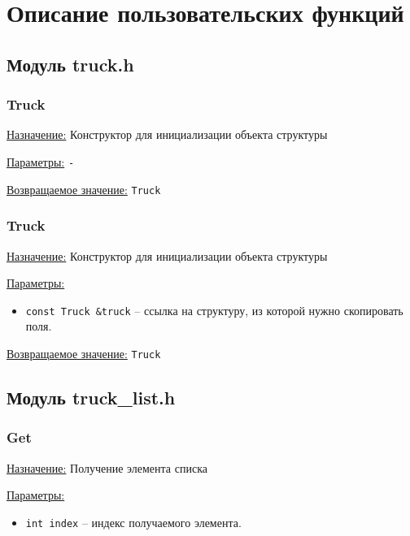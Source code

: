 \section*{Описание пользовательских функций}

\subsection*{Модуль truck.h}

\subsubsection*{Truck}

\underline{Назначение:} Конструктор для инициализации объекта структуры

\underline{Параметры:} \verb|-|

\underline{Возвращаемое значение:} \verb|Truck|


\subsubsection*{Truck}

\underline{Назначение:} Конструктор для инициализации объекта структуры

\underline{Параметры:} 

\begin{itemize}
    \item \verb|const Truck &truck| -- ссылка на структуру, из которой нужно скопировать поля.
\end{itemize}

\underline{Возвращаемое значение:} \verb|Truck|


\subsection*{Модуль truck\_list.h}

\subsubsection*{Get}

\underline{Назначение:} Получение элемента списка

\underline{Параметры:} 

\begin{itemize}
    \item \verb|int index| -- индекс получаемого элемента.
\end{itemize}


